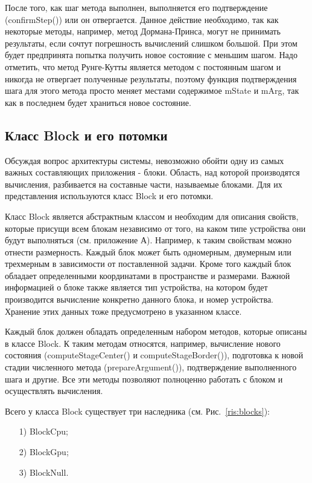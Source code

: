 \documentclass[a4paper, 14pt]{extarticle}
\theoremstyle{definition}
\begin{document}
\par После того, как шаг метода выполнен, выполняется его подтверждение (confirmStep()) или он отвергается. Данное действие необходимо, так как некоторые методы, например, метод Дормана-Принса, могут не принимать результаты, если сочтут погрешность вычислений слишком большой. При этом будет предпринята попытка получить новое состояние с меньшим шагом. Надо отметить, что метод Рунге-Кутты является методом с постоянным шагом и никогда не отвергает полученные результаты, поэтому функция подтверждения шага для этого метода просто меняет местами содержимое mState и mArg, так как в последнем будет храниться новое состояние.



\subsection{Класс Block и его потомки}

\par Обсуждая вопрос архитектуры системы, невозможно обойти одну из самых важных составляющих приложения - блоки. Область, над которой производятся вычисления, разбивается на составные части, называемые блоками. Для их представления используются класс Block и его потомки.

\par Класс Block является абстрактным классом и необходим для описания свойств, которые присущи всем блокам независимо от того, на каком типе устройства они будут выполняться (см. приложение А). Например, к таким свойствам можно отнести размерность. Каждый блок может быть одномерным, двумерным или трехмерным в зависимости от поставленной задачи. Кроме того каждый блок обладает определенными координатами в пространстве и размерами. Важной информацией о блоке также является тип устройства, на котором будет производится вычисление конкретно данного блока, и номер устройства. Хранение этих данных тоже предусмотрено в указанном классе.

\par Каждый блок должен обладать определенным набором методов, которые описаны в классе Block. К таким методам относятся, например, вычисление нового состояния (computeStageCenter() и computeStageBorder()), подготовка к новой стадии численного метода (prepareArgument()), подтверждение выполненного шага и другие. Все эти методы позволяют полноценно работать с блоком и осуществлять вычисления.

\par Всего у класса Block существует три наследника (см. Рис.~\ref{ris:blocks}):
\begin{enumerate}
\item[1)] BlockCpu;
\item[2)] BlockGpu;
\item[3)] BlockNull.
\end{enumerate}
\end{document}
